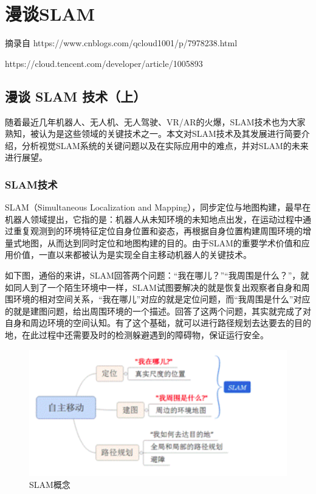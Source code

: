 
\chapter{漫谈SLAM}

摘录自 https://www.cnblogs.com/qcloud1001/p/7978238.html

https://cloud.tencent.com/developer/article/1005893

\section{漫谈 SLAM 技术（上）}
随着最近几年机器人、无人机、无人驾驶、VR/AR的火爆，SLAM技术也为大家熟知，被认为是这些领域的关键技术之一。本文对SLAM技术及其发展进行简要介绍，分析视觉SLAM系统的关键问题以及在实际应用中的难点，并对SLAM的未来进行展望。

\subsection{SLAM技术}

SLAM（Simultaneous Localization and Mapping），同步定位与地图构建，最早在机器人领域提出，它指的是：机器人从未知环境的未知地点出发，在运动过程中通过重复观测到的环境特征定位自身位置和姿态，再根据自身位置构建周围环境的增量式地图，从而达到同时定位和地图构建的目的。由于SLAM的重要学术价值和应用价值，一直以来都被认为是实现全自主移动机器人的关键技术。

如下图，通俗的来讲，SLAM回答两个问题：“我在哪儿？”“我周围是什么？”，就如同人到了一个陌生环境中一样，SLAM试图要解决的就是恢复出观察者自身和周围环境的相对空间关系，“我在哪儿”对应的就是定位问题，而“我周围是什么”对应的就是建图问题，给出周围环境的一个描述。回答了这两个问题，其实就完成了对自身和周边环境的空间认知。有了这个基础，就可以进行路径规划去达要去的目的地，在此过程中还需要及时的检测躲避遇到的障碍物，保证运行安全。

\begin{figure}[h]%
	\centering  %
	\includegraphics[width=0.7\linewidth]{image/Talk/1.png}  %
	\caption{SLAM概念}  %
\end{figure}

